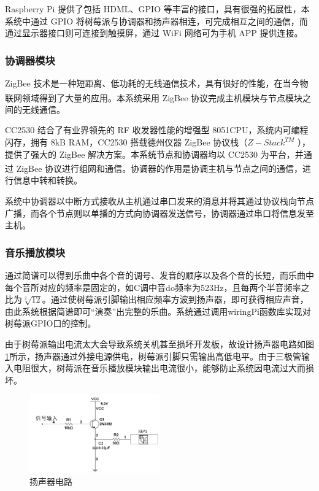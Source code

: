 \documentclass[a4paper,11pt,onecolumn,twoside]{article}
\newcommand{\supercite}[1]{\textsuperscript{\cite{#1}}}
\begin{document}
\begin{spacing}{1.2}
    Raspberry Pi 提供了包括 HDML、GPIO 等丰富的接口，具有很强的拓展性，本系统中通过 GPIO 将树莓派与协调器和扬声器相连，可完成相互之间的通信，而通过显示器接口则可连接到触摸屏，通过 WiFi 网络可为手机 APP 提供连接。

    \subsubsection{协调器模块}
    ZigBee 技术是一种短距离、低功耗的无线通信技术，具有很好的性能，在当今物联网领域得到了大量的应用\supercite{13}。本系统采用 ZigBee 协议完成主机模块与节点模块之间的无线通信。

    CC2530 结合了有业界领先的 RF 收发器性能的增强型 8051CPU，系统内可编程闪存，拥有 8kB RAM，CC2530 搭载德州仪器 ZigBee 协议栈（$Z-Stack^{TM}$ ），提供了强大的 ZigBee 解决方案。本系统节点和协调器均以 CC2530 为平台，并通过 ZigBee 协议进行组网和通信\supercite{14}。协调器的作用是协调主机与节点之间的通信，进行信息中转和转换。

    系统中协调器以中断方式接收从主机通过串口发来的消息并将其通过协议栈向节点广播，而各个节点则以单播的方式向协调器发送信号，协调器通过串口将信息发至主机。


    \subsubsection{音乐播放模块}
    通过简谱可以得到乐曲中各个音的调号、发音的顺序以及各个音的长短，而乐曲中每个音所对应的频率是固定的，如C调中音do频率为523Hz，且每两个半音频率之比为$\sqrt[2]{12}$。通过使树莓派引脚输出相应频率方波到扬声器，即可获得相应声音，由此系统根据简谱即可“演奏”出完整的乐曲。系统通过调用wiringPi函数库实现对树莓派GPIO口的控制。

    由于树莓派输出电流太大会导致系统关机甚至损坏开发板，故设计扬声器电路如图\ref{fig:yangshengqi}所示，扬声器通过外接电源供电，树莓派引脚只需输出高低电平。由于三极管输入电阻很大，树莓派在音乐播放模块输出电流很小，能够防止系统因电流过大而损坏。

\begin{figure}[htb]
    \centering
    {\includegraphics [width=0.5\textwidth]{./image/music.png}
    \caption{扬声器电路}
    \label{fig:yangshengqi}}
\end{figure}


\end{spacing}
\end{document}
